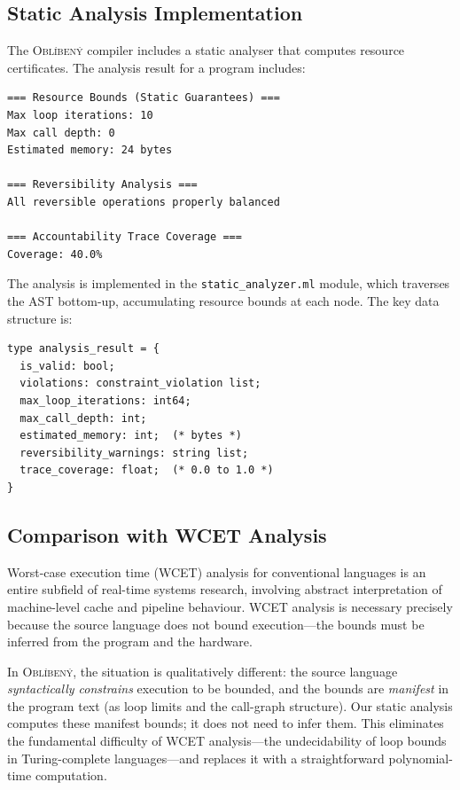 \documentclass[11pt,a4paper]{article}
\newcommand{\obl}{\textsc{Obl\'{i}ben\'{y}}}
\begin{document}
\subsection{Static Analysis Implementation}

The \obl{} compiler includes a static analyser that computes resource
certificates.  The analysis result for a program includes:

\begin{lstlisting}[language={},caption={Static analysis output for Fibonacci example}]
=== Resource Bounds (Static Guarantees) ===
Max loop iterations: 10
Max call depth: 0
Estimated memory: 24 bytes

=== Reversibility Analysis ===
All reversible operations properly balanced

=== Accountability Trace Coverage ===
Coverage: 40.0%
\end{lstlisting}

The analysis is implemented in the \texttt{static\_analyzer.ml} module, which
traverses the AST bottom-up, accumulating resource bounds at each node.  The
key data structure is:

\begin{lstlisting}[language=ocaml-ast,caption={Resource analysis result type (OCaml)}]
type analysis_result = {
  is_valid: bool;
  violations: constraint_violation list;
  max_loop_iterations: int64;
  max_call_depth: int;
  estimated_memory: int;  (* bytes *)
  reversibility_warnings: string list;
  trace_coverage: float;  (* 0.0 to 1.0 *)
}
\end{lstlisting}

\subsection{Comparison with WCET Analysis}

Worst-case execution time (WCET) analysis \citep{wilhelm2008wcet} for
conventional languages is an entire subfield of real-time systems research,
involving abstract interpretation of machine-level cache and pipeline
behaviour.  WCET analysis is necessary precisely because the source language
does not bound execution---the bounds must be inferred from the program and
the hardware.

In \obl{}, the situation is qualitatively different: the source language
\emph{syntactically constrains} execution to be bounded, and the bounds are
\emph{manifest} in the program text (as loop limits and the call-graph
structure).  Our static analysis computes these manifest bounds; it does not
need to infer them.  This eliminates the fundamental difficulty of WCET
analysis---the undecidability of loop bounds in Turing-complete
languages---and replaces it with a straightforward polynomial-time
computation.
\end{document}
